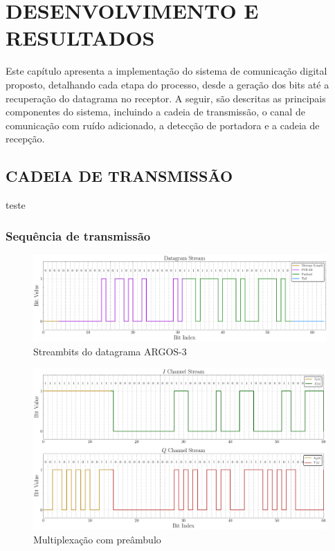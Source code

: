 \chapter{DESENVOLVIMENTO E RESULTADOS}\label{cap:desenvolvimento}

Este capítulo apresenta a implementação do sistema de comunicação digital proposto, detalhando cada etapa do processo, desde a geração dos bits até a recuperação do datagrama no receptor. A seguir, são descritas as principais componentes do sistema, incluindo a cadeia de transmissão, o canal de comunicação com ruído adicionado, a detecção de portadora e a cadeia de recepção.

\section{CADEIA DE TRANSMISSÃO}\label{sec:transmissao}

teste

\subsection{Sequência de transmissão}\label{sec:geracao_bits}

\begin{figure}[H]
	\centering
	\caption{Streambits do datagrama ARGOS-3}\label{fig:datagrama_time}
	\includegraphics[width=\linewidth]{assets/cap3/transmitter_datagram_time.pdf}
\end{figure}

\begin{figure}[H]
	\centering
	\caption{Multiplexação com preâmbulo}\label{fig:mux_time}
	\includegraphics[width=\linewidth]{assets/cap3/transmitter_mux_time.pdf}
\end{figure}


